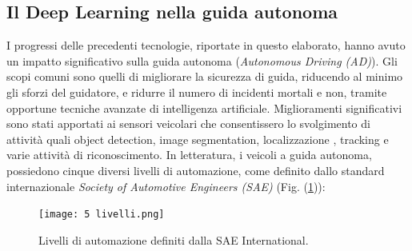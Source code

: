 \subsection{Il Deep Learning nella guida autonoma}
I progressi delle precedenti tecnologie, riportate in questo elaborato, hanno 
avuto un impatto significativo sulla guida autonoma (\emph{Autonomous Driving 
(AD)}). Gli scopi comuni sono quelli di migliorare la sicurezza di guida, 
riducendo al minimo gli sforzi del guidatore, e ridurre il numero di incidenti 
mortali e non, tramite opportune tecniche avanzate di intelligenza artificiale. 
Miglioramenti significativi sono stati apportati ai sensori veicolari 
che consentissero lo svolgimento di attività quali object detection, image 
segmentation, localizzazione , tracking e varie attività di riconoscimento. 
In letteratura, i veicoli a guida autonoma, possiedono cinque diversi livelli 
di automazione, come definito dallo standard internazionale \emph{Society of 
Automotive Engineers (SAE)} (Fig. (\ref{sae})):
\begin{figure}
    \centering
    \texttt{[image: 5 livelli.png]}
    \centering
    \caption{Livelli di automazione definiti dalla SAE International.}
    \label{sae}
\end{figure}
